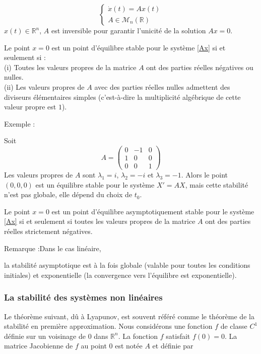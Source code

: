 \documentclass[12pt,a4paper]{report}%
\newcounter{remm}[chapter]
\newenvironment{remarque}[2][]
  {\refstepcounter{remm}
  \begin{bclogo}[
    couleur=white,
    arrondi=0.1,
    couleurBord=white,#1]{Remarque \theremm:#2}
  }
  {\end{bclogo}}
\newcounter{PP}[chapter]
\newenvironment{exemple}[2][]
  {\refstepcounter{PP}
  \begin{bclogo}[
    logo=\bccrayon , %
    couleur=white,
    arrondi=0.1,
    barre =snake,
     tailleOndu = 1.5,
    couleurBord=white,#1]{Exemple \thePP:#2}
  }
  {\end{bclogo}}
\begin{document}
\begin{equation}\label{Ax}
\left\{
\begin{array}{c}
\dot{x}(t)=A x (t)\\
A \in\mathcal{M}_{n}(\mathbb{R})
\end{array}
\right.
\end{equation}
$x(t) \in \mathbb{R}^n$, $A$ est inversible pour garantir l'unicité de la solution $Ax=0$.
\begin{théorème}{}{}
Le point \(x=0\) est un point d'équilibre stable pour le système \eqref{Ax} si et seulement si :\\
(i) Toutes les valeurs propres de la matrice \(A\) ont des parties réelles négatives ou nulles.\\
(ii) Les valeurs propres de \(A\) avec des parties réelles nulles admettent des diviseurs élémentaires simples (c'est-à-dire la multiplicité algébrique  de cette valeur propre est $1$).
\end{théorème}
\begin{exemple}{}
Soit 
$$
A = \begin{pmatrix}
0 & -1 & 0 \\
1 & 0 & 0 \\
0 & 0 & 1
\end{pmatrix}
$$
Les valeurs propres de $A$ sont $\lambda_1 = i$, $\lambda_2 = -i$ et $\lambda_3 = -1$. Alors le point $(0, 0, 0)$ est un équilibre stable pour le système $X' = AX$, mais cette stabilité n'est pas globale, elle dépend du choix de $t_0$.

\end{exemple}
\begin{théorème}{}{}
Le point \(x=0\) est un point d'équilibre asymptotiquement stable pour le système \eqref{Ax} si et seulement si toutes les valeurs propres de la matrice \(A\) ont des parties réelles strictement négatives.
\end{théorème}
\begin{remarque}{Dans le cas linéaire,}
la stabilité asymptotique est à la fois globale (valable pour toutes les conditions initiales) et exponentielle (la convergence vers l'équilibre est exponentielle).
\end{remarque}
\subsubsection{La stabilité des systèmes non linéaires}
Le théorème suivant, dû à Lyapunov, est souvent référé comme le théorème de la stabilité en première approximation. Nous considérons une fonction \( f \) de classe \( C^1 \) définie sur un voisinage de \( 0 \) dans \( \mathbb{R}^n \). La fonction \( f \) satisfait \( f(0) = 0 \). La matrice Jacobienne de \( f \) au point \( 0 \) est notée \( A \) et définie par
\end{document}
